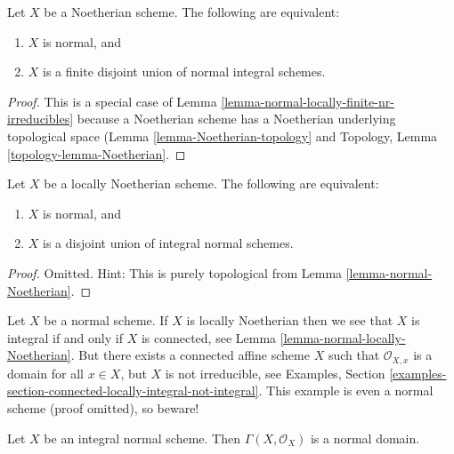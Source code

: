 \begin{lemma}
\label{lemma-normal-Noetherian}
Let $X$ be a Noetherian scheme.
The following are equivalent:
\begin{enumerate}
\item $X$ is normal, and
\item $X$ is a finite disjoint union of normal integral schemes.
\end{enumerate}
\end{lemma}

\begin{proof}
This is a special case of
Lemma \ref{lemma-normal-locally-finite-nr-irreducibles} because a Noetherian
scheme has a Noetherian underlying topological space
(Lemma \ref{lemma-Noetherian-topology}
and
Topology, Lemma \ref{topology-lemma-Noetherian}.
\end{proof}

\begin{lemma}
\label{lemma-normal-locally-Noetherian}
Let $X$ be a locally Noetherian scheme.
The following are equivalent:
\begin{enumerate}
\item $X$ is normal, and
\item $X$ is a disjoint union of integral normal schemes.
\end{enumerate}
\end{lemma}

\begin{proof}
Omitted. Hint: This is purely topological from
Lemma \ref{lemma-normal-Noetherian}.
\end{proof}

\begin{remark}
\label{remark-normal-connected-irreducible}
Let $X$ be a normal scheme. If $X$ is locally Noetherian then we see that
$X$ is integral if and only if $X$ is connected, see
Lemma \ref{lemma-normal-locally-Noetherian}.
But there exists a connected affine scheme $X$ such that
$\mathcal{O}_{X, x}$ is a domain for all $x \in X$, but $X$ is not
irreducible, see Examples, Section
\ref{examples-section-connected-locally-integral-not-integral}.
This example is even a normal scheme (proof omitted), so beware!
\end{remark}

\begin{lemma}
\label{lemma-normal-integral-sections}
Let $X$ be an integral normal scheme.
Then $\Gamma(X, \mathcal{O}_X)$ is a normal domain.
\end{lemma}

